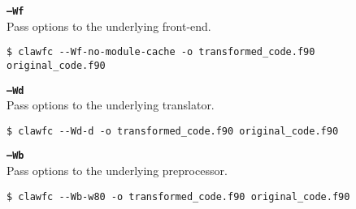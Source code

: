 \documentclass{article}
\begin{document}
\textbf{\texttt{--Wf}}\\
Pass options to the underlying front-end. 
\begin{lstlisting}
$ clawfc --Wf-no-module-cache -o transformed_code.f90 original_code.f90
\end{lstlisting}

\textbf{\texttt{--Wd}}\\
Pass options to the underlying translator. 
\begin{lstlisting}
$ clawfc --Wd-d -o transformed_code.f90 original_code.f90
\end{lstlisting}

\textbf{\texttt{--Wb}}\\
Pass options to the underlying preprocessor. 
\begin{lstlisting}
$ clawfc --Wb-w80 -o transformed_code.f90 original_code.f90
\end{lstlisting}
\end{document}
